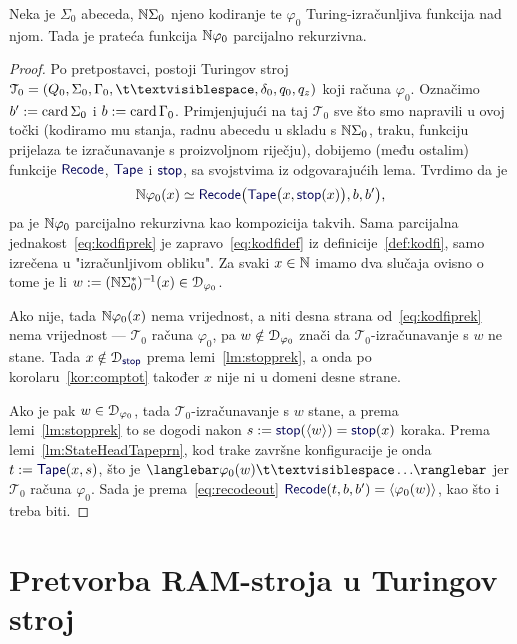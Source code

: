 \begin{teorem}[{name=[parcijalna rekurzivnost pratećih Turing-izračunljivih funkcija]}]\label{tm:tikp}
Neka je $\Sigma_0$ abeceda, ${\mathbb N}\Sigma_0$ njeno kodiranje te $\varphi_0$ Turing-izračunljiva funkcija nad njom. Tada je prateća funkcija ${\mathbb N}\varphi_0$ parcijalno rekurzivna.
\end{teorem}
\begin{proof}
Po pretpostavci, postoji Turingov stroj $\mathcal T_0=(Q_0,\Sigma_0,\Gamma_0,\bl,\delta_0,q_0,q_z)$ koji računa $\varphi_0$. Označimo $b':=\operatorname{card}\Sigma_0$ i $b:=\operatorname{card}\Gamma_0$. Primjenjujući na taj $\mathcal T_0$ sve što smo napravili u ovoj točki (kodiramo mu stanja, radnu abecedu u skladu s ${\mathbb N}\Sigma_0$, traku, funkciju prijelaza te izračunavanje s proizvoljnom riječju), dobijemo (među ostalim) funkcije $\f{Recode}$, $\f{Tape}$ i $\f{stop}$, sa svojstvima iz odgovarajućih lema. Tvrdimo da je
\begin{equation}\label{eq:kodfiprek}
    \N\varphi_0(x)\simeq
    \f{Recode}\bigl(\f{Tape}\bigl(x,\f{stop}(x)\bigr),b,b'\bigr)\text,
\end{equation}
	pa je ${\mathbb N}\varphi_0$ parcijalno rekurzivna kao kompozicija takvih. Sama parcijalna jednakost~\eqref{eq:kodfiprek} je zapravo~\eqref{eq:kodfidef} iz definicije~\ref{def:kodfi}, samo izrečena u "izračunljivom obliku". Za svaki $x\in{\mathbb N}$ imamo dva slučaja ovisno o tome je li $w:=({\mathbb N}\Sigma_0^*)^{-\mspace{-2mu}1}(x)\in\mathcal D_{\varphi_0}$.

Ako nije, tada ${\mathbb N}\varphi_0(x)$ nema vrijednost, a niti desna strana od~\eqref{eq:kodfiprek} nema vrijednost --- $\mathcal T_0$ računa $\varphi_0$, pa $w\notin\mathcal D_{\varphi_0}$ znači da $\mathcal T_0$-izračunavanje s $w$ ne stane. Tada $x\notin\dom{\f{stop}}$ prema lemi~\ref{lm:stopprek}, a onda po korolaru~\ref{kor:comptot} također $x$ nije ni u domeni desne strane.

Ako je pak $w\in\mathcal D_{\varphi_0}$, tada $\mathcal T_0$-izračunavanje s $w$ stane, a prema lemi~\ref{lm:stopprek} to se dogodi nakon $s:=\f{stop}(\kr w)=\f{stop}(x)$ koraka. Prema lemi~\ref{lm:StateHeadTapeprn}, kod trake završne konfiguracije je onda $t:=\f{Tape}(x,s)$, što je $\knk{\varphi_0(w)\bl\ldots}$ jer $\mathcal T_0$ računa $\varphi_0$. Sada je prema~\eqref{eq:recodeout} $\f{Recode}(t,b,b')=\kr{\varphi_0(w)}$, kao što i treba biti.
\end{proof}

\section{Pretvorba RAM-stroja u Turingov stroj}\label{sec:RAM>Turing}

